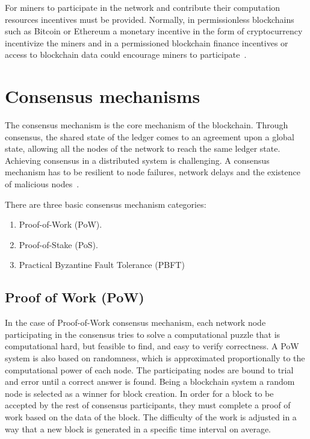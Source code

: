 For miners to participate in the network and contribute their computation resources incentives must be provided.
Normally, in permissionless blockchains such as Bitcoin or Ethereum a monetary incentive in the form of cryptocurrency
incentivize the miners and in a permissioned blockchain finance incentives or access to blockchain data could encourage miners to participate~\cite{deloitte}.

\section{Consensus mechanisms}\label{blockchain:consensus_mechanisms}

The consensus mechanism is the core mechanism of the blockchain. Through consensus, the shared state of the ledger comes to an agreement upon a global state,
allowing all the nodes of the network to reach the same ledger state. Achieving consensus in a distributed system is challenging.
A consensus mechanism has to be resilient to node failures, network delays and the existence of malicious nodes~\cite{wiki:byzantine_fault_tolerance}.

There are three basic consensus mechanism categories:

\begin{enumerate}
  \item Proof-of-Work (PoW).
  \item Proof-of-Stake (PoS).
  \item Practical Byzantine Fault Tolerance (PBFT)
\end{enumerate}


\subsection{Proof of Work (PoW)}\label{blockchain:consensus:pow}

In the case of Proof-of-Work consensus mechanism, each network node participating in
the consensus tries to solve a computational puzzle that is computational hard, but feasible to find, and easy to verify correctness.
A PoW system is also based on randomness, which is approximated proportionally to the computational power of each node.
The participating nodes are bound to trial and error until a correct answer is found. Being a blockchain system a random node is selected as a winner for block creation.
In order for a block to be accepted by the rest of consensus participants, they must complete a proof of work based on the data of the block.
The difficulty of the work is adjusted in a way that a new block is generated in a specific time interval on average.

